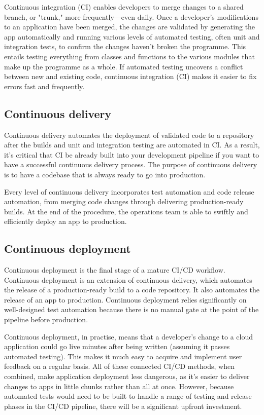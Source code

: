 \tab Continuous integration (CI) enables developers to merge changes to a shared branch, or "trunk," more frequently—even daily. Once a developer's modifications to an application have been merged, the changes are validated by generating the app automatically and running various levels of automated testing, often unit and integration tests, to confirm the changes haven't broken the programme. This entails testing everything from classes and functions to the various modules that make up the programme as a whole. If automated testing uncovers a conflict between new and existing code, continuous integration (CI) makes it easier to fix errors fast and frequently.

\subsection*{Continuous delivery}
\tab Continuous delivery automates the deployment of validated code to a repository after the builds and unit and integration testing are automated in CI. As a result, it's critical that CI be already built into your development pipeline if you want to have a successful continuous delivery process. The purpose of continuous delivery is to have a codebase that is always ready to go into production.

\tab Every level of continuous delivery incorporates test automation and code release automation, from merging code changes through delivering production-ready builds. At the end of the procedure, the operations team is able to swiftly and efficiently deploy an app to production.

\subsection*{Continuous deployment}
\tab Continuous deployment is the final stage of a mature CI/CD workflow. Continuous deployment is an extension of continuous delivery, which automates the release of a production-ready build to a code repository. It also automates the release of an app to production. Continuous deployment relies significantly on well-designed test automation because there is no manual gate at the point of the pipeline before production.

\tab Continuous deployment, in practise, means that a developer's change to a cloud application could go live minutes after being written (assuming it passes automated testing). This makes it much easy to acquire and implement user feedback on a regular basis. All of these connected CI/CD methods, when combined, make application deployment less dangerous, as it's easier to deliver changes to apps in little chunks rather than all at once. However, because automated tests would need to be built to handle a range of testing and release phases in the CI/CD pipeline, there will be a significant upfront investment.

